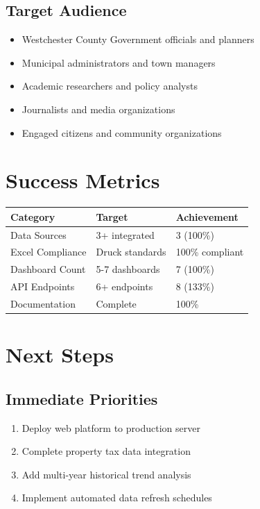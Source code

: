 \documentclass[11pt,letterpaper]{article}
\begin{document}
\subsection*{Target Audience}
\begin{itemize}
    \item Westchester County Government officials and planners
    \item Municipal administrators and town managers
    \item Academic researchers and policy analysts
    \item Journalists and media organizations
    \item Engaged citizens and community organizations
\end{itemize}

\section*{Success Metrics}

\begin{table}[h]
\centering
\begin{tabular}{lll}
\toprule
\textbf{Category} & \textbf{Target} & \textbf{Achievement} \\
\midrule
Data Sources & 3+ integrated & 3 (100\%) \\
Excel Compliance & Druck standards & 100\% compliant \\
Dashboard Count & 5-7 dashboards & 7 (100\%) \\
API Endpoints & 6+ endpoints & 8 (133\%) \\
Documentation & Complete & 100\% \\
\bottomrule
\end{tabular}
\end{table}

\section*{Next Steps}

\subsection*{Immediate Priorities}
\begin{enumerate}
    \item Deploy web platform to production server
    \item Complete property tax data integration
    \item Add multi-year historical trend analysis
    \item Implement automated data refresh schedules
\end{enumerate}
\end{document}
